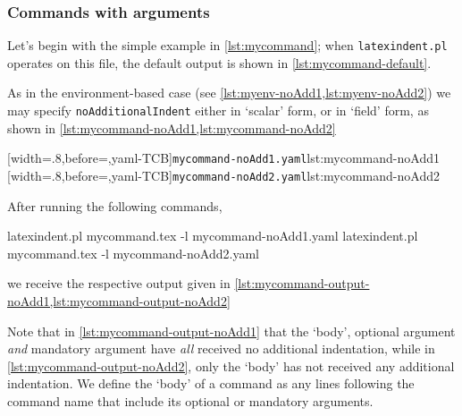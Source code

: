 \subsubsection{Commands with arguments}\label{subsubsec:commands-arguments}
 \begin{example}
 Let's begin with the simple example in \cref{lst:mycommand}; when
 \texttt{latexindent.pl} operates on this file, the default output is shown in
 \cref{lst:mycommand-default}.

 \begin{cmhtcbraster}[raster column skip=.1\linewidth]
 \end{cmhtcbraster}

 As in the environment-based case (see \vref{lst:myenv-noAdd1,lst:myenv-noAdd2}) we may
 specify \texttt{noAdditionalIndent} either in `scalar' form, or in `field' form, as
 shown in \cref{lst:mycommand-noAdd1,lst:mycommand-noAdd2}

 \begin{cmhtcbraster}
  [width=.8\linewidth,before=\centering,yaml-TCB]{\texttt{mycommand-noAdd1.yaml}}{lst:mycommand-noAdd1}
  [width=.8\linewidth,before=\centering,yaml-TCB]{\texttt{mycommand-noAdd2.yaml}}{lst:mycommand-noAdd2}
 \end{cmhtcbraster}

 After running the following commands, 

 \begin{commandshell}
latexindent.pl mycommand.tex -l mycommand-noAdd1.yaml  
latexindent.pl mycommand.tex -l mycommand-noAdd2.yaml  
\end{commandshell}

 we receive the respective output given in
 \cref{lst:mycommand-output-noAdd1,lst:mycommand-output-noAdd2}

 \begin{cmhtcbraster}
 \end{cmhtcbraster}

 Note that in \cref{lst:mycommand-output-noAdd1} that the `body', optional argument
 \emph{and} mandatory argument have \emph{all} received no additional indentation, while
 in \cref{lst:mycommand-output-noAdd2}, only the `body' has not received any additional
 indentation. We define the `body' of a command as any lines following the command name
 that include its optional or mandatory arguments.
 \end{example}

